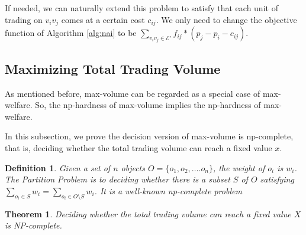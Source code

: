 \documentclass{aamas2015}
\newtheorem{theorem}{Theorem}%
\newtheorem{definition}{Definition}
\begin{document}
%

If needed, we can naturally extend this problem to satisfy that each unit of trading on $v_iv_j$ comes at a certain cost $c_{ij}$.
We only need to change the objective function of Algorithm \ref{alg:nai} to be $\sum_{v_iv_j\in \mathcal{E}'}f_{ij}*(p_j-p_i-c_{ij}) $.
\subsection{Maximizing Total Trading Volume}
As mentioned before, {\sc max-volume} can be regarded as a special case of {\sc max-welfare}.
So, the {\sc np-hardness} of {\sc max-volume} implies the {\sc np-hardness} of {\sc max-welfare}.



In this subsection, we prove the decision version of {\sc max-volume} is {\sc np-complete}, that is, deciding whether the total trading volume can reach a fixed value $x$.

\begin{definition}
	Given a set of $n$ objects $O=\{o_1,o_2,\ldots. o_n\}$, the weight of $o_i$ is $w_i$. The {\sc Partition Problem} is to deciding whether there is a subset $S$ of $O$ satisfying $\sum_{o_i\in S}w_i=\sum_{o_i\in O\setminus S}w_i$. It is a well-known {\sc np-complete} problem
\end{definition}

\begin{theorem}\label{thm:npc1}
	Deciding whether the total trading volume can reach a fixed value $X$ is {\sc NP-complete}.
\end{theorem}
\end{document}
